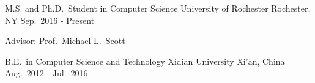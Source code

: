

\begin{cventries}

  \cventry
    {M.S. and Ph.D.\ Student in Computer Science} %
    {University of Rochester} %
    {Rochester, NY} %
    {Sep.\ 2016 - Present} %
    {
      \begin{cvitems} %
        \item {Advisor: Prof.\ Michael L.\ Scott}
      \end{cvitems}
    }

  \cventrys
    {B.E.\ in Computer Science and Technology} %
    {Xidian University} %
    {Xi'an, China} %
    {Aug.\ 2012 - Jul.\ 2016} %

\end{cventries}
